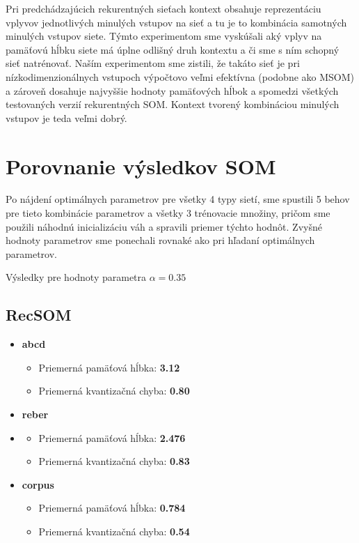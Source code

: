 Pri predchádzajúcich rekurentných sieťach kontext obsahuje reprezentáciu vplyvov jednotlivých minulých vstupov na sieť a tu je to kombinácia samotných minulých vstupov siete. 
Týmto experimentom sme vyskúšali aký vplyv na pamäťovú hĺbku siete má úplne odlišný druh kontextu a či sme s ním schopný sieť natrénovať.
Naším experimentom sme zistili, že takáto sieť je pri nízkodimenzionálnych vstupoch výpočtovo veľmi efektívna (podobne ako MSOM) a zároveň dosahuje 
najvyššie hodnoty pamäťových hĺbok a spomedzi všetkých testovaných verzií rekurentných SOM.
Kontext tvorený kombináciou minulých vstupov je teda veľmi dobrý.



\section {Porovnanie výsledkov SOM}
Po nájdení optimálnych parametrov pre všetky 4 typy sietí, sme spustili 5 behov pre tieto kombinácie parametrov a všetky 3 trénovacie množiny,
pričom sme použili náhodnú inicializáciu váh a spravili priemer týchto hodnôt. Zvyšné hodnoty parametrov sme ponechali
rovnaké ako pri hľadaní optimálnych parametrov.

Výsledky pre hodnoty parametra $\alpha = 0.35$
\subsection{RecSOM}
\begin{itemize}
    \item \textbf{abcd}
    \begin{itemize}
        \item Priemerná pamäťová hĺbka: \textbf{3.12}
        \item Priemerná kvantizačná chyba: \textbf{0.80}
    \end{itemize}
    \item \textbf{reber}
    \item \begin{itemize}
        \item Priemerná pamäťová hĺbka: \textbf{2.476}
        \item Priemerná kvantizačná chyba: \textbf{0.83}
    \end{itemize}
    \item \textbf{corpus}
    \begin{itemize}
        \item Priemerná pamäťová hĺbka: \textbf{0.784}
        \item Priemerná kvantizačná chyba: \textbf{0.54}
    \end{itemize}
\end{itemize}

